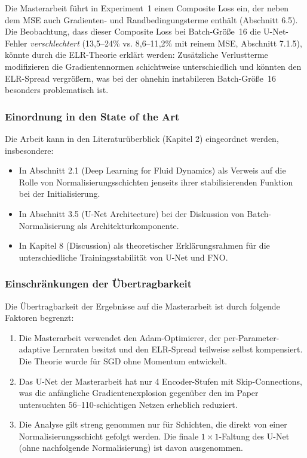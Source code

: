 \documentclass[a4paper,12pt]{article}
\begin{document}
Die Masterarbeit führt in Experiment~1 einen Composite Loss ein, der neben dem MSE auch Gradienten- und Randbedingungsterme enthält (Abschnitt 6.5). Die Beobachtung, dass dieser Composite Loss bei Batch-Größe~16 die U-Net-Fehler \emph{verschlechtert} (13{,}5--24\% vs. 8{,}6--11{,}2\% mit reinem MSE, Abschnitt 7.1.5), könnte durch die ELR-Theorie erklärt werden: Zusätzliche Verlustterme modifizieren die Gradientennormen schichtweise unterschiedlich und könnten den ELR-Spread vergrößern, was bei der ohnehin instabileren Batch-Größe~16 besonders problematisch ist.

\subsubsection*{Einordnung in den State of the Art}

Die Arbeit kann in den Literaturüberblick (Kapitel 2) eingeordnet werden, insbesondere:
\begin{itemize}
    \item In Abschnitt 2.1 (Deep Learning for Fluid Dynamics) als Verweis auf die Rolle von Normalisierungsschichten jenseits ihrer stabilisierenden Funktion bei der Initialisierung.
    \item In Abschnitt 3.5 (U-Net Architecture) bei der Diskussion von Batch-Normalisierung als Architekturkomponente.
    \item In Kapitel 8 (Discussion) als theoretischer Erklärungsrahmen für die unterschiedliche Trainingsstabilität von U-Net und FNO.
\end{itemize}

\subsubsection*{Einschränkungen der Übertragbarkeit}

Die Übertragbarkeit der Ergebnisse auf die Masterarbeit ist durch folgende Faktoren begrenzt:
\begin{enumerate}
    \item Die Masterarbeit verwendet den Adam-Optimierer, der per-Parameter-adaptive Lernraten besitzt und den ELR-Spread teilweise selbst kompensiert. Die Theorie wurde für SGD ohne Momentum entwickelt.
    \item Das U-Net der Masterarbeit hat nur 4 Encoder-Stufen mit Skip-Connections, was die anfängliche Gradientenexplosion gegenüber den im Paper untersuchten 56--110-schichtigen Netzen erheblich reduziert.
    \item Die Analyse gilt streng genommen nur für Schichten, die direkt von einer Normalisierungsschicht gefolgt werden. Die finale $1 \times 1$-Faltung des U-Net (ohne nachfolgende Normalisierung) ist davon ausgenommen.
\end{enumerate}
\end{document}
